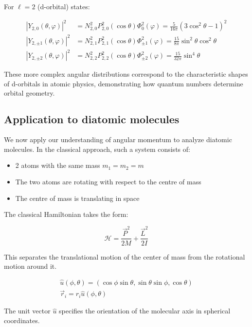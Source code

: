 \documentclass[italian]{HKNdocument}
\begin{document}
For $\ell=2$ (d-orbital) states:

\begin{align}
\left|Y_{2,0}(\theta, \varphi)\right|^{2} & =N_{2,0}^{2} P_{2,0}^{2}(\cos \theta) \Phi_{0}^{2}(\varphi)=\frac{5}{16 \pi}\left(3 \cos ^{2} \theta-1\right)^{2} \\
\left|Y_{2, \pm 1}(\theta, \varphi)\right|^{2} & =N_{2,1}^{2} P_{2,1}^{2}(\cos \theta) \Phi_{ \pm 1}^{2}(\varphi)=\frac{15}{8 \pi} \sin ^{2} \theta \cos ^{2} \theta  \\
\left|Y_{2, \pm 2}(\theta, \varphi)\right|^{2} & =N_{2,2}^{2} P_{2,2}^{2}(\cos \theta) \Phi_{ \pm 2}^{2}(\varphi)=\frac{15}{32 \pi} \sin ^{4} \theta
\end{align}

These more complex angular distributions correspond to the characteristic shapes of d-orbitals in atomic physics, demonstrating how quantum numbers determine orbital geometry.

\subsection{Application to diatomic molecules}
We now apply our understanding of angular momentum to analyze diatomic molecules. In the classical approach, such a system consists of:

\begin{itemize}
  \item 2 atoms with the same mass $m_{1}=m_{2}=m$
  \item The two atoms are rotating with respect to the centre of mass
  \item The centre of mass is translating in space
\end{itemize}

The classical Hamiltonian takes the form:

\begin{equation}
\mathcal{H}=\frac{\vec{P}^{2}}{2 M}+\frac{\vec{L}^{2}}{2 I}
\end{equation}

This separates the translational motion of the center of mass from the rotational motion around it.

\[
\begin{array}{r}
\hat{u}(\phi, \theta)=(\cos \phi \sin \theta, \sin \theta \sin \phi, \cos \theta)  \\
\vec{r}_{i}=r_{i} \hat{u}(\phi, \theta)
\end{array}
\]

The unit vector $\hat{u}$ specifies the orientation of the molecular axis in spherical coordinates.
\end{document}
